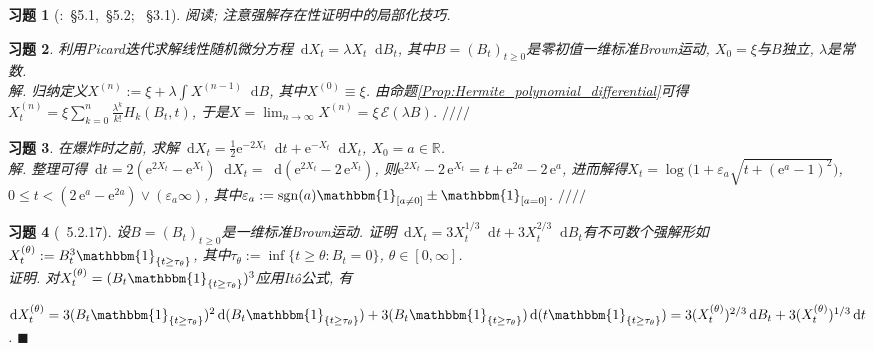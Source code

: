 \documentclass{ctexart}
\theoremstyle{definition}
\theoremstyle{remark}
\theoremstyle{plain}
\newtheorem{Ex}{习题}[section]
\newenvironment{Soln}{\vspace{1ex}\textbf{\\}{\color{red}\textit{解}}.\normalfont}{\color{red}\hfill$/\!/\!/\!/$\vspace{1ex}\par}
\newenvironment{Prf}{\vspace{1ex}\textbf{\\}{\color{red}\textit{证明}}.\normalfont}{\color{red}\hfill$\blacksquare$\vspace{1ex}\par}
\newcommand{\1}{\mathbbm{1}}				%
\newcommand{\sgn}[1]{\operatorname{sgn}(#1)}	%
\newcommand{\R}{\mathbb{R}}					%
\renewcommand*{\d}{\mathop{}\!\mathrm{d}}	%
\newcommand{\e}{\mathrm{e}}
\newcommand{\eps}{\varepsilon}
\begin{document}
\begin{Ex}[\cite{Karatzas-Shreve--GTM113}:~\S5.1,~\S5.2; \cite{龚光鲁-钱敏平}~\S3.1]
阅读; 注意强解存在性证明中的局部化技巧.
\end{Ex}


\begin{Ex}
利用Picard迭代求解线性随机微分方程$\d X_{t} = \lambda X_{t} \d B_{t}$, 其中$B = (B_{t})_{t \ge 0}$是零初值一维标准Brown运动, $X_{0} = \xi$与$B$独立, $\lambda$是常数.
\begin{Soln}
归纳定义$X^{(n)} := \xi + \lambda \int X^{(n-1)} \d B$, 其中$X^{(0)} \equiv \xi$. 由命题\ref{Prop:Hermite_polynomial_differential}可得$X^{(n)}_{t} = \xi \sum_{k=0}^{n} \frac{\lambda^k}{k!} H_{k}(B_{t},t)$, 于是$X = \lim_{n\to\infty}X^{(n)} = \xi \, \mathcal{E}(\lambda B)$.
\end{Soln}
\end{Ex}


\begin{Ex}
在爆炸时之前, 求解$\d X_{t} = \frac{1}{2}\e^{-2X_{t}} \d t + \e^{-X_{t}} \d X_{t}$, $X_{0} = a \in \R$.
\begin{Soln}
整理可得$\d t = 2 (\e^{2X_{t}}-\e^{X_{t}}) \d X_{t} = \d(\e^{2X_{t}}-2\,\e^{X_{t}})$, 则$\e^{2X_{t}}-2\,\e^{X_{t}} = t+\e^{2a}-2\,\e^{a}$, 进而解得$X_{t} = \log\big(1+\eps_{a}\sqrt{t+(\e^{a}-1)^{2}}\big)$, $0 \le t < (2\,\e^{a}-\e^{2a})\vee(\eps_{a}\infty)$, 其中$\eps_{a} := \sgn{a}\1_{[a \neq 0]} \pm \1_{[a = 0]}$.
\end{Soln}
\end{Ex}


\begin{Ex}[\cite{Karatzas-Shreve--GTM113}~5.2.17]
设$B = (B_{t})_{t \ge 0}$是一维标准Brown运动. 证明$\d X_{t} = 3 X_{t}^{1/3} \d t + 3 X_{t}^{2/3} \d B_{t}$有不可数个强解形如$X_{t}^{(\theta)} := B_{t}^{3} \1_{\{t\ge\tau_{\theta}\}}$, 其中$\tau_{\theta} := \inf\{ t \ge \theta : B_{t} = 0 \}$, $\theta \in [0,\infty]$.
\begin{Prf}
对$X_{t}^{(\theta)} = (B_{t}\1_{\{t\ge\tau_{\theta}\}})^{3}$应用It\^{o}公式, 有\par\hspace{-1em}
$\d X_{t}^{(\theta)} = 3(B_{t}\1_{\{t\ge\tau_{\theta}\}})^{2}\d(B_{t}\1_{\{t\ge\tau_{\theta}\}}) + 3(B_{t}\1_{\{t\ge\tau_{\theta}\}})\d(t\1_{\{t\ge\tau_{\theta}\}}) = 3 (X_{t}^{(\theta)})^{2/3} \d B_{t} + 3 (X_{t}^{(\theta)})^{1/3} \d t$.
\end{Prf}
\end{Ex}
\end{document}
